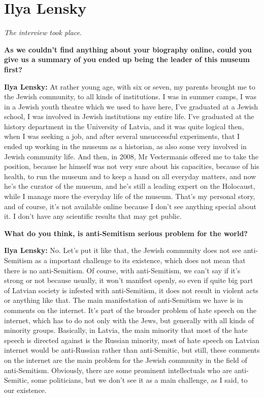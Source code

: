 \section{Ilya Lensky}

\textit{The interview took place}.\par
\vspace*{2em}
\textbf{As we couldn’t find anything about your biography online, could you give us a summary of you ended up being the leader of this museum first?}

\textbf{Ilya Lensky:} At rather young age, with six or seven, my parents brought me to the Jewish community, to all kinds of institutions. I was in summer camps, I was in a Jewish youth theatre which we used to have here, I’ve graduated at a Jewish school, I was involved in Jewish institutions my entire life. I’ve graduated at the history department in the University of Latvia, and it was quite logical then, when I was seeking a job, and after several unsuccessful experiments, that I ended up working in the museum as a historian, as also some very involved in Jewish community life. And then, in 2008, Mr Vestermanis offered me to take the position, because he himself was not very sure about his capacities, because of his health, to run the museum and to keep a hand on all everyday matters, and now he’s the curator of the museum, and he’s still a leading expert on the Holocaust, while I manage more the everyday life of the museum. That’s my personal story, and of course, it’s not available online because I don’t see anything special about it. I don’t have any scientific results that may get public. 

\textbf{What do you think, is anti-Semitism serious problem for the world?}

\textbf{Ilya Lensky:} No. Let’s put it like that, the Jewish community does not see anti-Semitism as a important challenge to its existence, which does not mean that there is no anti-Semitism. Of course, with anti-Semitism, we can’t say if it’s strong or not because usually, it won’t manifest openly, so even if quite big part of Latvian society is infested with anti-Semitism, it does not result in violent acts or anything like that. The main manifestation of anti-Semitism we have is in comments on the internet. It’s part of the broader problem of hate speech on the internet, which has to do not only with the Jews, but generally with all kinds of minority groups. Basically, in Latvia, the main minority that most of the hate speech is directed against is the Russian minority, most of hate speech on Latvian internet would be anti-Russian rather than anti-Semitic, but still, these comments on the internet are the main problem for the Jewish community in the field of anti-Semitism. Obviously, there are some prominent intellectuals who are anti-Semitic, some politicians, but we don’t see it as a main challenge, as I said, to our existence. 

